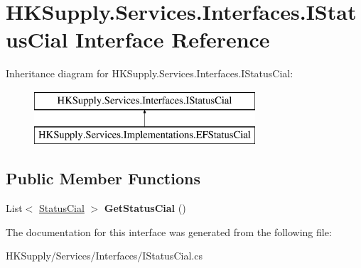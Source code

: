 \hypertarget{interface_h_k_supply_1_1_services_1_1_interfaces_1_1_i_status_cial}{}\section{H\+K\+Supply.\+Services.\+Interfaces.\+I\+Status\+Cial Interface Reference}
\label{interface_h_k_supply_1_1_services_1_1_interfaces_1_1_i_status_cial}
Inheritance diagram for H\+K\+Supply.\+Services.\+Interfaces.\+I\+Status\+Cial\+:\begin{figure}[H]
\begin{center}
\leavevmode
\includegraphics[height=2.000000cm]{interface_h_k_supply_1_1_services_1_1_interfaces_1_1_i_status_cial}
\end{center}
\end{figure}
\subsection*{Public Member Functions}
\begin{DoxyCompactItemize}
\item 
\mbox{\label{interface_h_k_supply_1_1_services_1_1_interfaces_1_1_i_status_cial_a06a9e935da453310543465c7f09e0b6e}} 
List$<$ \mbox{\hyperlink{class_h_k_supply_1_1_models_1_1_status_cial}{Status\+Cial}} $>$ {\bfseries Get\+Status\+Cial} ()
\end{DoxyCompactItemize}


The documentation for this interface was generated from the following file\+:\begin{DoxyCompactItemize}
\item 
H\+K\+Supply/\+Services/\+Interfaces/I\+Status\+Cial.\+cs\end{DoxyCompactItemize}
